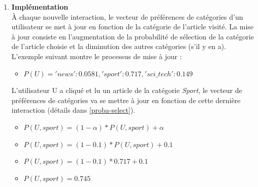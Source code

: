 \begin{enumerate}[leftmargin=*]
            \item\textbf{Implémentation}\\
            À chaque nouvelle interaction, le vecteur de préférences de catégories d'un utilisateur se met à jour en fonction de la catégorie  de l'article visité. La mise à jour consiste en l'augmentation de la probabilité de sélection de la catégorie de l'article choisie et la diminution des autres catégories (s'il y en a). 
            L'exemple suivant montre le processus de mise à jour :
            \begin{itemize}[label={}]
                \item $P(U) = {'news': 0.0581,'sport': 0.717, 'sci\_tech': 0.149}$\\
            \end{itemize}

            L'utilisateur U a cliqué et lu un article de la catégorie \emph{Sport}, le vecteur de préférences de catégories va se mettre à jour en fonction de cette dernière interaction (détails dans \ref{proba-select}).
            \begin{itemize}[label={}]
                \item $P(U, sport) = (1-{\alpha}) * {P(U, sport)} + {\alpha}$
                \item $P(U, sport) = (1-{0.1}) * {P(U, sport)} + {0.1}$
                \item $P(U, sport) = (1-{0.1}) * {0.717} + {0.1}$
                \item $P(U, sport) = 0.745$
            \end{itemize}


\end{enumerate}

